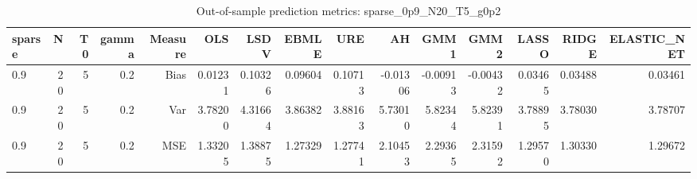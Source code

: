 \begin{table}[!htbp]\centering
\caption{Out-of-sample prediction metrics: sparse_0p9_N20_T5_g0p2}
\label{tab:table3_sparse_0p9_N20_T5_g0p2}
\begin{tabular}{lrrrrrrrrrrrrrr}
\hline
sparse & N & T0 & gamma & Measure & OLS & LSDV & EBMLE & URE & AH & GMM1 & GMM2 & LASSO & RIDGE & ELASTIC_NET \\
\hline
0.9 & 20 & 5 & 0.2 & Bias & 0.01231 & 0.10326 & 0.09604 & 0.10713 & -0.01306 & -0.00913 & -0.00432 & 0.03465 & 0.03488 & 0.03461 \\
0.9 & 20 & 5 & 0.2 & Var & 3.78200 & 4.31664 & 3.86382 & 3.88163 & 5.73010 & 5.82344 & 5.82391 & 3.78895 & 3.78030 & 3.78707 \\
0.9 & 20 & 5 & 0.2 & MSE & 1.33205 & 1.38875 & 1.27329 & 1.27741 & 2.10453 & 2.29365 & 2.31592 & 1.29570 & 1.30330 & 1.29672 \\
\hline
\end{tabular}
\end{table}

